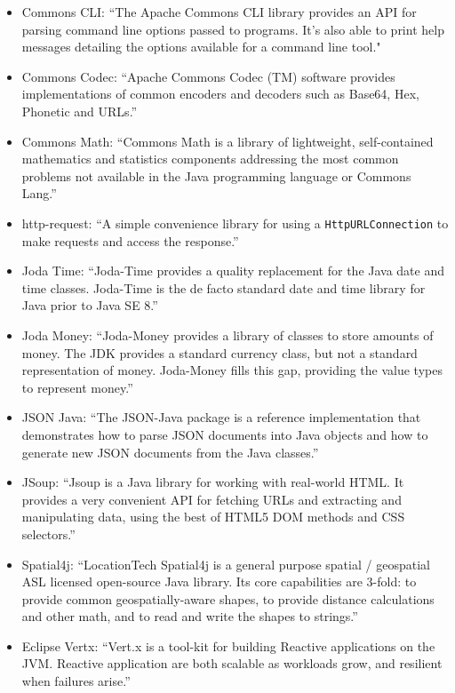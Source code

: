 \documentclass[sigconf]{acmart}
\begin{document}
\begin{itemize}
  \item{Commons CLI}: ``The Apache Commons CLI library provides an API for parsing command line options 
  passed to programs. It's also able to print help messages detailing the options available for a 
  command line tool." \cite{web:commonscli} 
  \item{Commons Codec}: ``Apache Commons Codec (TM) software provides implementations of common 
  encoders and decoders such as Base64, Hex, Phonetic and URLs.'' \cite{web:commonscodec}
  \item{Commons Math}: ``Commons Math is a library of lightweight, self-contained mathematics and 
  statistics components addressing the most common problems not available in the Java programming
   language or Commons Lang.'' \cite{web:commonsmath}
  \item{http-request}: ``A simple convenience library for using a \linebreak
  \verb|HttpURLConnection| to make requests and access the response.'' \cite{web:httpreq}
  \item{Joda Time}: ``Joda-Time provides a quality replacement for the Java date and time classes.
  Joda-Time is the de facto standard date and time library for Java prior to Java SE 8.'' \cite{web:jodatime}
  \item{Joda Money}: ``Joda-Money provides a library of classes to store amounts of money.
  The JDK provides a standard currency class, but not a standard representation of money. 
  Joda-Money fills this gap, providing the value types to represent money.'' \cite{web:jodamoney}
  \item{JSON Java}: ``The JSON-Java package is a reference implementation that demonstrates 
  how to parse JSON documents into Java objects and how to generate new JSON documents
  from the Java classes.'' \cite{web:jsonjava}
  \item{JSoup}: ``Jsoup is a Java library for working with real-world HTML. It provides a very 
  convenient API for fetching URLs and extracting and manipulating data, using the best of HTML5 
  DOM methods and CSS selectors.'' \cite{web:jsoup}
  \item{Spatial4j}: ``LocationTech Spatial4j is a general purpose spatial / geospatial ASL licensed 
  open-source Java library. Its core capabilities are 3-fold: to provide common geospatially-aware 
  shapes, to provide distance calculations and other math, and to read and write the shapes 
  to strings.'' \cite{web:spatial4j}
  \item{Eclipse Vertx}: ``Vert.x is a tool-kit for building Reactive applications on the JVM. 
  Reactive application are both scalable as workloads grow, and resilient
  when failures arise.'' \cite{web:vertx}
\end{itemize}
\end{document}
